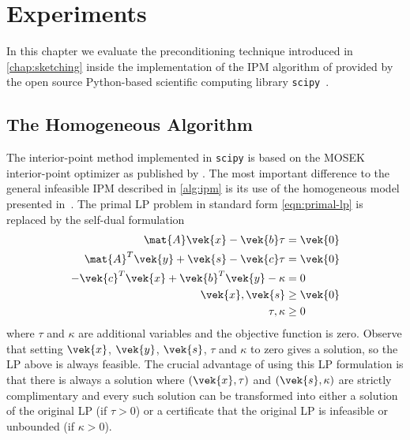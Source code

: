 \chapter{Experiments}\label{chap:experiments}

In this chapter we evaluate the preconditioning technique introduced in \cref{chap:sketching} inside the implementation of the IPM algorithm of \textcite{AndersenAndersen-MosekInteriorPointMethod} provided by the open source Python-based scientific computing library \texttt{scipy}~\cite{Scipy}.

\section{The Homogeneous Algorithm}

The interior-point method implemented in \texttt{scipy} is based on the MOSEK interior-point optimizer as published by \textcite{AndersenAndersen-MosekInteriorPointMethod}.
The most important difference to the general infeasible IPM described in \cref{alg:ipm} is its use of the homogeneous model presented in~\cite{XuHungYe-SimplifiedHomogeneousAlgorithm}.
The primal LP problem in standard form \cref{eqn:primal-lp} is replaced by the self-dual formulation
\begin{subequations}
  \begin{align}
    \mat{A}\vek{x} - \vek{b} \tau &= \vek{0} \\
    \mat{A}^T \vek{y} + \vek{s} - \vek{c}\tau &= \vek{0} \\
    - \vek{c}^T\vek{x} + \vek{b}^T\vek{y} - \kappa &= 0 \\
    \vek{x}, \vek{s} &\geq \vek{0} \\
    \tau, \kappa &\geq 0
  \end{align}
\end{subequations}
where \(\tau\) and \(\kappa\) are additional variables and the objective function is zero.
Observe that setting \(\vek{x}\), \(\vek{y}\), \(\vek{s}\), \(\tau\) and \(\kappa\) to zero gives a solution, so the LP above is always feasible.
The crucial advantage of using this LP formulation is that there is always a solution where \((\vek{x}, \tau)\) and \((\vek{s}, \kappa)\) are strictly complimentary and every such solution can be transformed into either a solution of the original LP (if \(\tau > 0\)) or a certificate that the original LP is infeasible or unbounded (if \(\kappa > 0\)).

